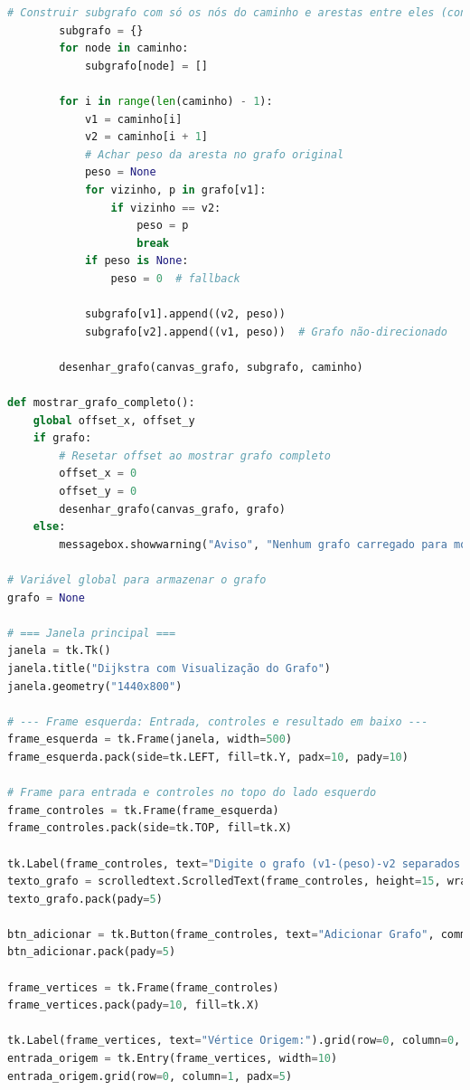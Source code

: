 \documentclass[12pt,a4paper]{report}
\begin{document}
\begin{lstlisting}[language=Python, caption=Dijkstra em Python (parcial)]
        # Construir subgrafo com só os nós do caminho e arestas entre eles (consecutivas)
        subgrafo = {}
        for node in caminho:
            subgrafo[node] = []

        for i in range(len(caminho) - 1):
            v1 = caminho[i]
            v2 = caminho[i + 1]
            # Achar peso da aresta no grafo original
            peso = None
            for vizinho, p in grafo[v1]:
                if vizinho == v2:
                    peso = p
                    break
            if peso is None:
                peso = 0  # fallback

            subgrafo[v1].append((v2, peso))
            subgrafo[v2].append((v1, peso))  # Grafo não-direcionado

        desenhar_grafo(canvas_grafo, subgrafo, caminho)

def mostrar_grafo_completo():
    global offset_x, offset_y
    if grafo:
        # Resetar offset ao mostrar grafo completo
        offset_x = 0
        offset_y = 0
        desenhar_grafo(canvas_grafo, grafo)
    else:
        messagebox.showwarning("Aviso", "Nenhum grafo carregado para mostrar.")

# Variável global para armazenar o grafo
grafo = None

# === Janela principal ===
janela = tk.Tk()
janela.title("Dijkstra com Visualização do Grafo")
janela.geometry("1440x800")

# --- Frame esquerda: Entrada, controles e resultado em baixo ---
frame_esquerda = tk.Frame(janela, width=500)
frame_esquerda.pack(side=tk.LEFT, fill=tk.Y, padx=10, pady=10)

# Frame para entrada e controles no topo do lado esquerdo
frame_controles = tk.Frame(frame_esquerda)
frame_controles.pack(side=tk.TOP, fill=tk.X)

tk.Label(frame_controles, text="Digite o grafo (v1-(peso)-v2 separados por '|'):", justify=tk.LEFT).pack(anchor=tk.W)
texto_grafo = scrolledtext.ScrolledText(frame_controles, height=15, wrap=tk.NONE, width=80)
texto_grafo.pack(pady=5)

btn_adicionar = tk.Button(frame_controles, text="Adicionar Grafo", command=adicionar_grafo)
btn_adicionar.pack(pady=5)

frame_vertices = tk.Frame(frame_controles)
frame_vertices.pack(pady=10, fill=tk.X)

tk.Label(frame_vertices, text="Vértice Origem:").grid(row=0, column=0, sticky=tk.W)
entrada_origem = tk.Entry(frame_vertices, width=10)
entrada_origem.grid(row=0, column=1, padx=5)


\end{lstlisting}
\end{document}
